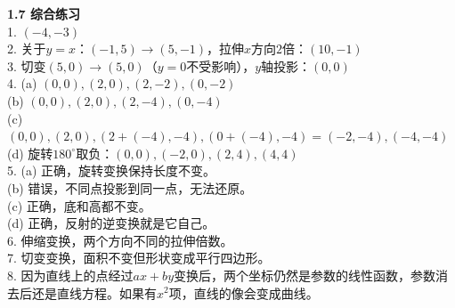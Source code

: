 \documentclass[a4paper,12pt]{ctexart}
\begin{document}
\noindent\textbf{1.7 综合练习}\\
1. $(-4,-3)$\\
2. 关于$y=x$：$(-1,5)\to(5,-1)$，拉伸$x$方向$2$倍：$(10,-1)$\\
3. 切变$(5,0)\to(5,0)$（$y=0$不受影响），$y$轴投影：$(0,0)$\\
4. (a) $(0,0),(2,0),(2,-2),(0,-2)$\\
\quad (b) $(0,0),(2,0),(2,-4),(0,-4)$\\
\quad (c) $(0,0),(2,0),(2+(-4),-4),(0+(-4),-4)=(-2,-4),(-4,-4)$\\
\quad (d) 旋转$180^\circ$取负：$(0,0),(-2,0),(2,4),(4,4)$\\
5. (a) 正确，旋转变换保持长度不变。\\
\quad (b) 错误，不同点投影到同一点，无法还原。\\
\quad (c) 正确，底和高都不变。\\
\quad (d) 正确，反射的逆变换就是它自己。\\
6. 伸缩变换，两个方向不同的拉伸倍数。\\
7. 切变变换，面积不变但形状变成平行四边形。\\
8. 因为直线上的点经过$ax+by$变换后，两个坐标仍然是参数的线性函数，参数消去后还是直线方程。如果有$x^2$项，直线的像会变成曲线。\\
\end{document}
